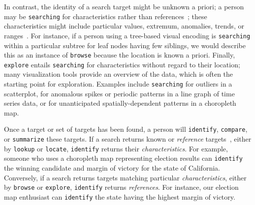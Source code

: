 In contrast, the identity of a search target might be unknown a priori; a person may be {\tt searching} for characteristics rather than references~\cite{Andrienko2006}; these characteristics might include particular values, extremum, anomalies, trends, or  ranges~\cite{Amar2005}.
For instance, if a person using a tree-based visual encoding is {\tt searching} within a particular subtree for leaf nodes having few siblings, we would describe this as an instance of {\tt browse} because the location is known a priori.
Finally, {\tt explore} entails {\tt searching} for characteristics without regard to their location; many visualization tools provide an overview of the data, which is often the starting point for exploration.
Examples include {\tt searching} for outliers in a scatterplot, for anomalous spikes or periodic patterns in a line graph of time series data, or for unanticipated spatially-dependent patterns in a choropleth map.

Once a target or set of targets has been found, a person will
{\tt identify}, {\tt compare}, or {\tt summarize} these targets.
If a search returns known or {\it reference} targets~\cite{Andrienko2006}, either by {\tt lookup} or {\tt locate}, {\tt identify} returns their {\it characteristics}.
For example, someone who uses a choropleth map representing election results can {\tt identify} the winning candidate and margin of victory for the state of California.
Conversely, if a search returns targets matching particular {\it characteristics}, either by {\tt browse} or {\tt explore}, {\tt identify} returns {\it references}.
For instance, our election map enthusiast can {\tt identify} the state having the highest margin of victory.

